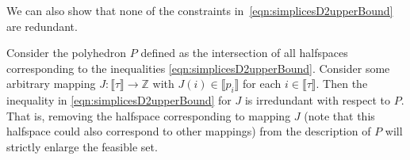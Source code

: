 \documentclass[smallextended]{svjour3}
\newcommand{\bbZ}{\mathbb{Z}}
\begin{document}
We can also show that none of the constraints in~\eqref{eqn:simplicesD2upperBound} are redundant.
\begin{proposition} \label{prop:simplicesD2FacetDefining}
Consider the polyhedron $P$ defined as the intersection of all halfspaces corresponding to the inequalities \eqref{eqn:simplicesD2upperBound}. Consider some arbitrary mapping $J : \llbracket \tau \rrbracket \to \bbZ$ with $J(i) \in \llbracket p_i \rrbracket$ for each $i \in \llbracket \tau \rrbracket$. Then the inequality in \eqref{eqn:simplicesD2upperBound} for $J$ is irredundant with respect to $P$. That is, removing the halfspace corresponding to mapping $J$ (note that this halfspace could also correspond to other mappings) from the description of $P$ will strictly enlarge the feasible set.

\end{proposition}
\end{document}
